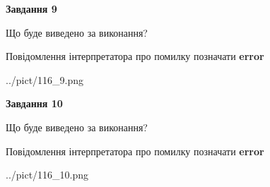 \documentclass[12pt, ukrainian]{article}
\begin{document}
{{\begin {center}\textbf{Завдання 9}\end {center}}\par
Що буде виведено за виконання? \par
Повідомлення інтерпретатора про помилку позначати \textbf{error}

\begin{center}
	{../pict/116_9.png}
\end{center}
\newpage

{\begin {center}\textbf{Завдання 10}\end {center}}\par
Що буде виведено за виконання? \par
Повідомлення інтерпретатора про помилку позначати \textbf{error}

\begin{center}
	{../pict/116_10.png}
\end{center}
\newpage

}
\end{document}
